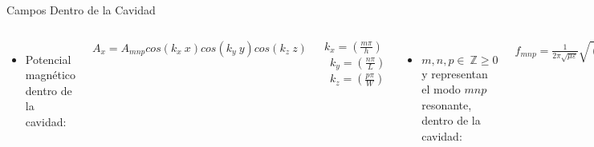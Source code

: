 \begin{frame}{Campos Dentro de la Cavidad}

\begin{columns}
    \begin{itemize}
        \item<2-> Potencial magnético dentro de la cavidad:
    \end{itemize}
    \begin{center}
        $A_x = A_{mnp} cos(k_x \ x) cos(k_y \ y) cos(k_z \ z)$\\
    \end{center}
    \begin{center}
        $k_x = \left( \frac{m \pi}{h} \right)$ \ $k_y = \left( \frac{n \pi}{L} \right)$ \ $k_z = \left( \frac{p \pi}{W} \right)$
    \end{center}

    \begin{itemize}
        \item<4-> $m, n, p \in \ \mathbb{Z} \geq 0$ y representan el modo $mnp$ resonante, dentro de la cavidad:
    \end{itemize}

    \begin{center}
        $f_{mnp} = \frac{1}{2 \pi \sqrt{\mu \varepsilon}}\sqrt{\left( \frac{m \pi}{h} \right)^2 + \left( \frac{n \pi}{L} \right)^2 + \left( \frac{p \pi}{W} \right)^2 }$
    \end{center}
            \texttt{[image: img/cavidad.png]}
\end{columns}
\end{frame}






